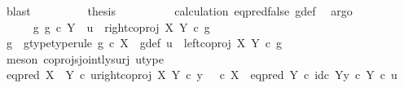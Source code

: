 \begin{isabellebody}
\ blast\isanewline
\ \ \ \ \ \ \isamarkupfalse%
\ \isamarkupfalse%
\ {\isacharquery}{\kern0pt}thesis\isanewline
\ \ \ \ \ \ \ \ \isamarkupfalse%
\ calculation\ eq{\isacharunderscore}{\kern0pt}pred{\isacharunderscore}{\kern0pt}false\ g{\isacharunderscore}{\kern0pt}def\ \isamarkupfalse%
\ argo\isanewline
\ \ \ \ \isamarkupfalse%
\isanewline
\ \ \isamarkupfalse%
\isanewline
\ \ \ \ \isamarkupfalse%
\ {\isachardoublequoteopen}{\isasymnexists}g{\isachardot}{\kern0pt}\ g\ {\isasymin}\isactrlsub c\ Y\ {\isasymand}\ u\ {\isacharequal}{\kern0pt}\ right{\isacharunderscore}{\kern0pt}coproj\ X\ Y\ {\isasymcirc}\isactrlsub c\ g{\isachardoublequoteclose}\isanewline
\ \ \ \ \isamarkupfalse%
\ \isamarkupfalse%
\ g\ \ g{\isacharunderscore}{\kern0pt}type{\isacharbrackleft}{\kern0pt}type{\isacharunderscore}{\kern0pt}rule{\isacharbrackright}{\kern0pt}{\isacharcolon}{\kern0pt}\ {\isachardoublequoteopen}g\ {\isasymin}\isactrlsub c\ X{\isachardoublequoteclose}\ \ g{\isacharunderscore}{\kern0pt}def{\isacharcolon}{\kern0pt}\ {\isachardoublequoteopen}u\ {\isacharequal}{\kern0pt}\ left{\isacharunderscore}{\kern0pt}coproj\ X\ Y\ {\isasymcirc}\isactrlsub c\ g{\isachardoublequoteclose}\isanewline
\ \ \ \ \ \ \isamarkupfalse%
\ {\isacharparenleft}{\kern0pt}meson\ coprojs{\isacharunderscore}{\kern0pt}jointly{\isacharunderscore}{\kern0pt}surj\ u{\isacharunderscore}{\kern0pt}type{\isacharparenright}{\kern0pt}\isanewline
\ \ \ \ \isamarkupfalse%
\ {\isachardoublequoteopen}eq{\isacharunderscore}{\kern0pt}pred\ {\isacharparenleft}{\kern0pt}X\ {\isasymCoprod}\ Y{\isacharparenright}{\kern0pt}\ {\isasymcirc}\isactrlsub c\ {\isasymlangle}u{\isacharcomma}{\kern0pt}right{\isacharunderscore}{\kern0pt}coproj\ X\ Y\ {\isasymcirc}\isactrlsub c\ y{\isasymrangle}\ {\isacharequal}{\kern0pt}\ {\isacharparenleft}{\kern0pt}{\isasymf}\ {\isasymcirc}\isactrlsub c\ {\isasymbeta}\isactrlbsub X\isactrlesub {\isacharparenright}{\kern0pt}\ {\isasymamalg}\ {\isacharparenleft}{\kern0pt}eq{\isacharunderscore}{\kern0pt}pred\ Y\ {\isasymcirc}\isactrlsub c\ {\isasymlangle}id\isactrlsub c\ Y{\isacharcomma}{\kern0pt}y\ {\isasymcirc}\isactrlsub c\ {\isasymbeta}\isactrlbsub Y\isactrlesub {\isasymrangle}{\isacharparenright}{\kern0pt}\ {\isasymcirc}\isactrlsub c\ u{\isachardoublequoteclose}\isanewline
\ \ \ \ \isamarkupfalse%
\ {\isacharminus}{\kern0pt}\isanewline
\ \ \ \ \ \ \isamarkupfalse%

\end{isabellebody}
